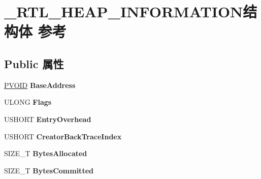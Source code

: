 \hypertarget{struct___r_t_l___h_e_a_p___i_n_f_o_r_m_a_t_i_o_n}{}\section{\+\_\+\+R\+T\+L\+\_\+\+H\+E\+A\+P\+\_\+\+I\+N\+F\+O\+R\+M\+A\+T\+I\+O\+N结构体 参考}
\label{struct___r_t_l___h_e_a_p___i_n_f_o_r_m_a_t_i_o_n}
\subsection*{Public 属性}
\begin{DoxyCompactItemize}
\item 
\mbox{\label{struct___r_t_l___h_e_a_p___i_n_f_o_r_m_a_t_i_o_n_aeee76d1a04c7ff18890727745d2ccf2f}} 
\hyperlink{interfacevoid}{P\+V\+O\+ID} {\bfseries Base\+Address}
\item 
\mbox{\label{struct___r_t_l___h_e_a_p___i_n_f_o_r_m_a_t_i_o_n_a8357deaef12b0aa7dd6d06dd8371e2f3}} 
U\+L\+O\+NG {\bfseries Flags}
\item 
\mbox{\label{struct___r_t_l___h_e_a_p___i_n_f_o_r_m_a_t_i_o_n_a6c2c09bc9a8c71c33da70410a0c01f30}} 
U\+S\+H\+O\+RT {\bfseries Entry\+Overhead}
\item 
\mbox{\label{struct___r_t_l___h_e_a_p___i_n_f_o_r_m_a_t_i_o_n_a07bcfb381f08bc3a00822e27fcecf50a}} 
U\+S\+H\+O\+RT {\bfseries Creator\+Back\+Trace\+Index}
\item 
\mbox{\label{struct___r_t_l___h_e_a_p___i_n_f_o_r_m_a_t_i_o_n_abdcd6b7d0a72641abfb217dc345aba81}} 
S\+I\+Z\+E\+\_\+T {\bfseries Bytes\+Allocated}
\item 
\mbox{\label{struct___r_t_l___h_e_a_p___i_n_f_o_r_m_a_t_i_o_n_afd1b666cce28eeadb7398d2723e403b8}} 
S\+I\+Z\+E\+\_\+T {\bfseries Bytes\+Committed}
\item 
\mbox{\label{struct___r_t_l___h_e_a_p___i_n_f_o_r_m_a_t_i_o_n_aae9c84e3947443c79784702c5446307e}} 

\end{DoxyCompactItemize}
